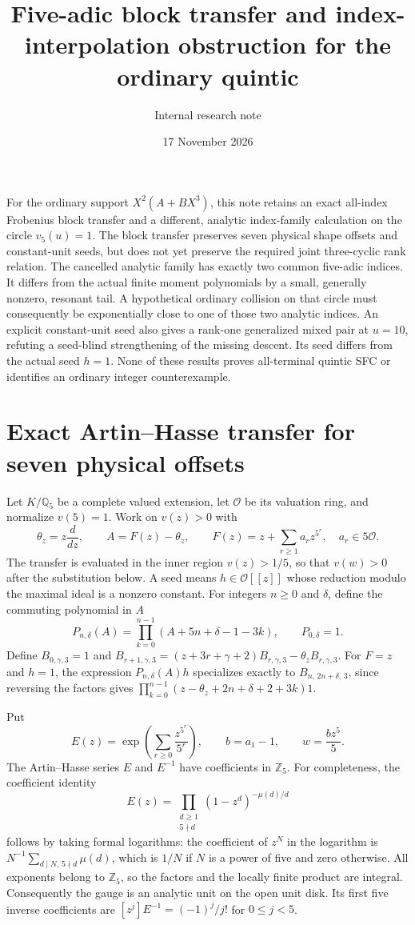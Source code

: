 \documentclass[11pt]{article}
\newcommand{\OO}{\mathcal O}
\begin{document}
\title{Five-adic block transfer and index-interpolation obstruction for the ordinary quintic}
\author{Internal research note}
\date{17 November 2026}
\maketitle

For the ordinary support $X^2(A+BX^3)$, this note retains an exact
all-index Frobenius block transfer and a different, analytic
index-family calculation on the circle $v_5(u)=1$.
The block transfer preserves seven physical shape offsets and
constant-unit seeds, but does not yet preserve the required
joint three-cyclic rank relation.
The cancelled analytic family has exactly two common five-adic
indices. It differs from the actual finite moment polynomials
by a small, generally nonzero, resonant tail.
A hypothetical ordinary collision on that circle must consequently
be exponentially close to one of those two analytic indices.
An explicit constant-unit seed also gives a rank-one generalized
mixed pair at $u=10$, refuting a seed-blind strengthening of the
missing descent. Its seed differs from the actual seed $h=1$.
None of these results proves all-terminal quintic SFC or identifies an
ordinary integer counterexample.

\section{Exact Artin--Hasse transfer for seven physical offsets}
Let $K/\mathbb Q_5$ be a complete valued extension, let $\OO$ be its
valuation ring, and normalize $v(5)=1$.  Work on $v(z)>0$ with
\[
 \theta_z=z\frac{d}{dz},\qquad
 A=F(z)-\theta_z,\qquad
 F(z)=z+\sum_{r\ge1}a_rz^{5^r},\quad a_r\in5\OO .
\]
The transfer is evaluated in the inner region $v(z)>1/5$, so that
$v(w)>0$ after the substitution below.
A seed means $h\in\OO[[z]]$ whose reduction modulo the maximal ideal
is a nonzero constant.  For integers $n\ge0$ and $\delta$, define the commuting polynomial in $A$
\[
 P_{n,\delta}(A)=
 \prod_{k=0}^{n-1}(A+5n+\delta-1-3k),\qquad P_{0,\delta}=1 .
\]
Define $B_{0,\gamma,3}=1$ and
$B_{r+1,\gamma,3}=(z+3r+\gamma+2)B_{r,\gamma,3}-\theta_zB_{r,\gamma,3}$.
For $F=z$ and $h=1$, the expression $P_{n,\delta}(A)h$ specializes exactly to
$B_{n,\,2n+\delta,\,3}$, since reversing the factors gives
$\prod_{k=0}^{n-1}(z-\theta_z+2n+\delta+2+3k)1$.

Put
\[
 E(z)=\exp\left(\sum_{r\ge0}\frac{z^{5^r}}{5^r}\right),\qquad
 b=a_1-1,\qquad w=\frac{bz^5}{5}.
\]
The Artin--Hasse series $E$ and $E^{-1}$ have coefficients in
$\mathbb Z_5$.  For completeness, the coefficient identity
\[
 E(z)=\prod_{\substack{d\ge1\\5\nmid d}}
                 (1-z^d)^{-\mu(d)/d}
\]
follows by taking formal logarithms: the coefficient of $z^N$ in
the logarithm is $N^{-1}\sum_{d\mid N,\,5\nmid d}\mu(d)$,
which is $1/N$ if $N$ is a power of five and zero otherwise.
All exponents belong to $\mathbb Z_5$, so the factors and the
locally finite product are integral.  Consequently the gauge is
an analytic unit on the open unit disk.  Its first five inverse
coefficients are $[z^j]E^{-1}=(-1)^j/j!$ for $0\le j<5$.
\end{document}
